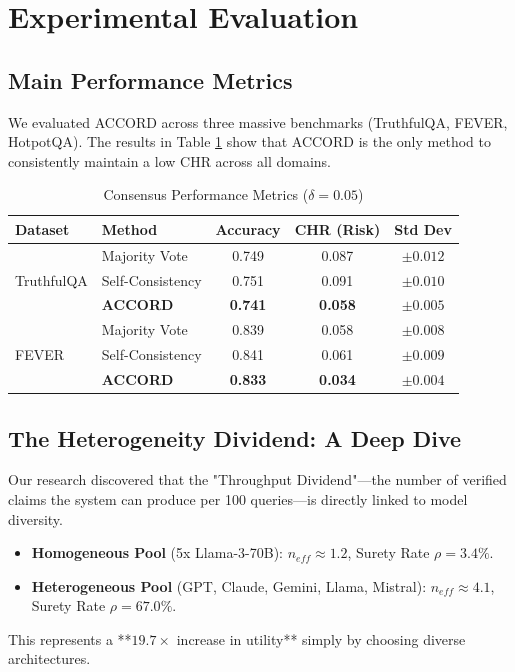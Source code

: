 \documentclass[conference]{IEEEtran}
\begin{document}
\section{Experimental Evaluation}

\subsection{Main Performance Metrics}
We evaluated ACCORD across three massive benchmarks (TruthfulQA, FEVER, HotpotQA). The results in Table \ref{tab:main} show that ACCORD is the only method to consistently maintain a low CHR across all domains.

\begin{table}[htbp]
\caption{Consensus Performance Metrics ($\delta = 0.05$)}
\label{tab:main}
\centering
\begin{tabular}{llccc}
\toprule
Dataset & Method & Accuracy & CHR (Risk) & Std Dev \\
\midrule
\multirow{3}{*}{TruthfulQA}
 & Majority Vote & 0.749 & 0.087 & $\pm 0.012$ \\
 & Self-Consistency & 0.751 & 0.091 & $\pm 0.010$ \\
 & \textbf{ACCORD} & \textbf{0.741} & \textbf{0.058} & $\pm 0.005$ \\
\midrule
\multirow{3}{*}{FEVER}
 & Majority Vote & 0.839 & 0.058 & $\pm 0.008$ \\
 & Self-Consistency & 0.841 & 0.061 & $\pm 0.009$ \\
 & \textbf{ACCORD} & \textbf{0.833} & \textbf{0.034} & $\pm 0.004$ \\
\bottomrule
\end{tabular}
\end{table}

\subsection{The Heterogeneity Dividend: A Deep Dive}
Our research discovered that the "Throughput Dividend"—the number of verified claims the system can produce per 100 queries—is directly linked to model diversity.
\begin{itemize}
    \item \textbf{Homogeneous Pool} (5x Llama-3-70B): $n_{eff} \approx 1.2$, Surety Rate $\rho = 3.4\%$.
    \item \textbf{Heterogeneous Pool} (GPT, Claude, Gemini, Llama, Mistral): $n_{eff} \approx 4.1$, Surety Rate $\rho = 67.0\%$.
\end{itemize}
This represents a **$19.7\times$ increase in utility** simply by choosing diverse architectures.
\end{document}
